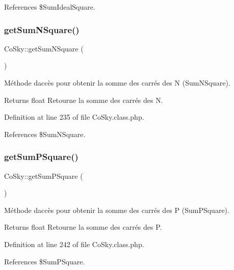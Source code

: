References \$\+Sum\+Ideal\+Square.

\mbox{\label{class_co_sky_a6d4eb34b228caeed98cd4df68da2fd4d}} 
\subsubsection{\texorpdfstring{get\+Sum\+N\+Square()}{getSumNSquare()}}
{\footnotesize\ttfamily Co\+Sky\+::get\+Sum\+N\+Square (\begin{DoxyParamCaption}{ }\end{DoxyParamCaption})}

Méthode d\textquotesingle{}accès pour obtenir la somme des carrés des N (Sum\+N\+Square).

\begin{DoxyReturn}{Returns}
float Retourne la somme des carrés des N. 
\end{DoxyReturn}


Definition at line 235 of file Co\+Sky.\+class.\+php.



References \$\+Sum\+N\+Square.

\mbox{\label{class_co_sky_a0682dc9d023c580550f35fb45a2a83cd}} 
\subsubsection{\texorpdfstring{get\+Sum\+P\+Square()}{getSumPSquare()}}
{\footnotesize\ttfamily Co\+Sky\+::get\+Sum\+P\+Square (\begin{DoxyParamCaption}{ }\end{DoxyParamCaption})}

Méthode d\textquotesingle{}accès pour obtenir la somme des carrés des P (Sum\+P\+Square).

\begin{DoxyReturn}{Returns}
float Retourne la somme des carrés des P. 
\end{DoxyReturn}


Definition at line 242 of file Co\+Sky.\+class.\+php.



References \$\+Sum\+P\+Square.


